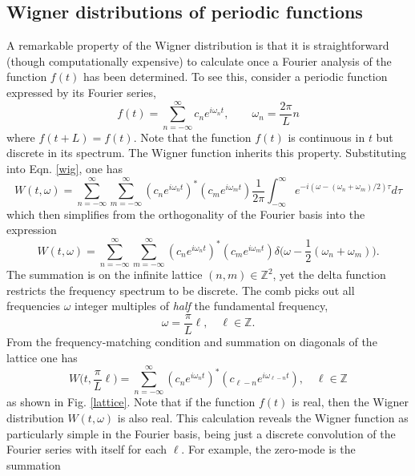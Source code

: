 \documentclass{article}
\begin{document}
\begin{appendices}

  \newpage
  \section{Wigner distributions of periodic functions}\label{periodic}
  A remarkable property of the Wigner distribution is that it is straightforward (though computationally expensive) to calculate once a Fourier analysis of the function $f(t)$ has been determined. To see this, consider a periodic function expressed by its Fourier series,
\begin{equation}
  f(t) = \sum_{n=-\infty}^\infty c_ne^{i\omega_nt},\quad\quad \omega_n = \frac{2\pi}{L}n
\end{equation}
where $f(t+L)=f(t)$. Note that the function $f(t)$ is continuous in $t$ but discrete in its spectrum. The Wigner function inherits this property. Substituting into Eqn. \ref{wig}, one has
\begin{equation}
  W(t,\omega) = \sum_{n=-\infty}^\infty\sum_{m=-\infty}^\infty (c_ne^{i\omega_n t})^*(c_me^{i\omega_m t})\frac{1}{2\pi}\int_{-\infty}^\infty e^{-i(\omega-(\omega_n+\omega_m)/2)\tau}d\tau
\end{equation}
which then simplifies from the orthogonality of the Fourier basis into the expression
\begin{equation}
  W(t,\omega) = \sum_{n=-\infty}^\infty\sum_{m=-\infty}^\infty (c_ne^{i\omega_nt})^*(c_me^{i\omega_mt})\delta\Big(\omega - \frac{1}{2}(\omega_n+\omega_m)\Big).
\end{equation}
The summation is on the infinite lattice $(n,m)\in\mathbb{Z}^2$, yet the delta function restricts the frequency spectrum to be discrete. The comb picks out all frequencies $\omega$ integer multiples of \textit{half} the fundamental frequency,
\begin{equation}
  \omega = \frac{\pi}{L}\ell,\quad \ell\in\mathbb{Z}.
\end{equation}
From the frequency-matching condition and summation on diagonals of the lattice one has
\begin{equation}
  W\Big(t,\frac{\pi}{L}\ell\Big) = \sum_{n=-\infty}^\infty(c_ne^{i\omega_nt})^*(c_{\ell-n}e^{i\omega_{\ell - n}t}),\quad \ell\in\mathbb{Z}
\end{equation}
as shown in Fig. \ref{lattice}. Note that if the function $f(t)$ is real, then the Wigner distribution $W(t,\omega)$ is also real. This calculation reveals the Wigner function as particularly simple in the Fourier basis, being just a discrete convolution of the Fourier series with itself for each $\ell$. For example, the zero-mode is the summation

\end{appendices}
\end{document}
